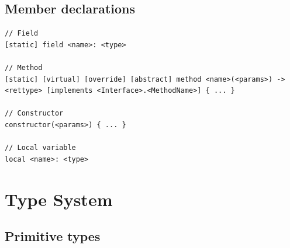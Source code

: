 \documentclass[11pt,a4paper]{article}
\begin{document}
\subsection{Member declarations}

\begin{lstlisting}[language=TextIR]
// Field
[static] field <name>: <type>

// Method
[static] [virtual] [override] [abstract] method <name>(<params>) -> <rettype> [implements <Interface>.<MethodName>] { ... }

// Constructor
constructor(<params>) { ... }

// Local variable
local <name>: <type>
\end{lstlisting}

\section{Type System}

\subsection{Primitive types}
\end{document}
